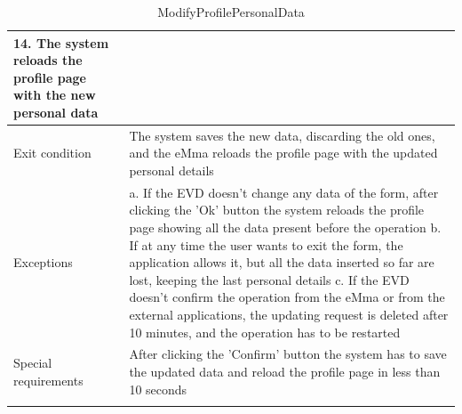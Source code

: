 \begin{center}
\begin{longtable}{p{4cm} p{11cm}}
                    14. The system reloads the profile page with the new personal data \\
     \hline
     Exit condition & The system saves the new data, discarding the old ones, and the eMma reloads the profile page with the updated personal details\\
     \hline
     Exceptions &   a. If the EVD doesn't change any data of the form, after clicking the 'Ok' button the system                        reloads the profile page showing all the data present before the operation \newline
                    b. If at any time the user wants to exit the form, the application allows it, but all the data inserted so far are lost, keeping the last personal details \newline
                    c. If the EVD doesn't confirm the operation from the eMma or from the external applications, the updating request is deleted after 10 minutes, and the operation has to be restarted 
                    \\
     \hline
     Special requirements & After clicking the 'Confirm' button the system has to save the updated data and reload the profile page in less than 10 seconds \\
     \hline
    \caption{ModifyProfilePersonalData}
    \label{tab:ModifyProfilePersonalData}
    \end{longtable}
\end{center}

